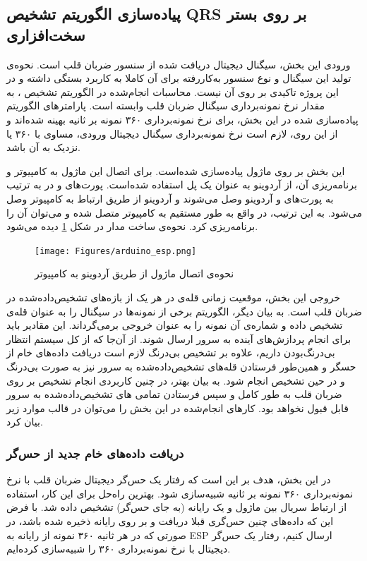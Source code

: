 	\subsection{پیاده‌سازی الگوریتم تشخیص QRS بر روی بستر سخت‌افزاری}
	
ورودی این بخش، سیگنال دیجیتال دریافت شده از سنسور ضربان قلب است. نحوه‌ی تولید این سیگنال و نوع سنسور به‌کاررفته برای آن کاملا به کاربرد بستگی داشته و در این پروژه تاکیدی بر روی آن نیست. محاسبات انجام‌شده در الگوریتم تشخیص ، به مقدار نرخ نمونه‌برداری سیگنال ضربان قلب وابسته است. پارامترهای الگوریتم پیاده‌سازی شده در این بخش، برای نرخ نمونه‌برداری ۳۶۰ نمونه بر ثانیه بهینه شده‌اند و از این روی، لازم است نرخ نمونه‌برداری سیگنال دیجیتال ورودی، مساوی با ۳۶۰ یا نزدیک به آن باشد.

این بخش بر روی ماژول  پیاده‌سازی شده‌است. برای اتصال این ماژول به کامپیوتر و برنامه‌ریزی آن، از آردوینو به عنوان یک پل استفاده شده‌است. پورت‌های  و  در  به ترتیب به پورت‌های  و  آردوینو وصل می‌شوند و آردوینو از طریق ارتباط  به کامپیوتر وصل می‌شود. به این ترتیب،  در واقع به طور مستقیم به کامپیوتر متصل شده و می‌توان آن را برنامه‌ریزی کرد. نحوه‌ی ساخت مدار در شکل \ref{fig:arduino} دیده می‌شود.

\begin{figure}[!htb]
\centering
\texttt{[image: Figures/arduino\_esp.png]}
\caption{نحوه‌ی اتصال ماژول  از طریق آردوینو به کامپیوتر}
\label{fig:arduino}
\end{figure}


خروجی این بخش، موقعیت زمانی قله‌ی  در هر یک از بازه‌های  تشخیص‌داده‌شده در ضربان قلب است. به بیان دیگر، الگوریتم برخی از نمونه‌ها در سیگنال را به عنوان قله‌ی  تشخیص داده و شماره‌ی آن نمونه را به عنوان خروجی برمی‌گرداند. این مقادیر باید برای انجام پردازش‌های آینده به سرور ارسال شوند. از آن‌جا که از کل سیستم انتظار بی‌درنگ‌بودن داریم، علاوه بر تشخیص بی‌درنگ  لازم است دریافت داد‌ه‌های خام از حسگر و همین‌طور فرستادن قله‌های  تشخیص‌داده‌شده به سرور نیز به صورت بی‌درنگ و در حین تشخیص  انجام شود. به بیان بهتر، در چنین کاربردی انجام تشخیص  بر روی ضربان قلب به طور کامل و سپس فرستادن تمامی های تشخیص‌داده‌شده به سرور قابل قبول نخواهد بود.
کارهای انجام‌شده در این بخش را می‌توان در قالب موارد زیر بیان کرد. 
\subsubsection{دریافت داده‌های خام جدید از حس‌گر}
در این بخش، هدف بر این است که رفتار یک حس‌گر دیجیتال ضربان قلب با نرخ نمونه‌برداری ۳۶۰ نمونه بر ثانیه شبیه‌سازی شود. بهترین راه‌حل برای این کار، استفاده از ارتباط سریال بین ماژول و یک رایانه (به جای حس‌گر) تشخیص داده شد. با فرض این که داده‌های چنین حس‌گری قبلا دریافت و بر روی رایانه ذخیره شده باشد، در صورتی که در هر ثانیه ۳۶۰ نمونه از رایانه به ESP ارسال کنیم، رفتار یک حس‌گر دیجیتال با نرخ نمونه‌برداری ۳۶۰ را شبیه‌سازی کرده‌ایم.

